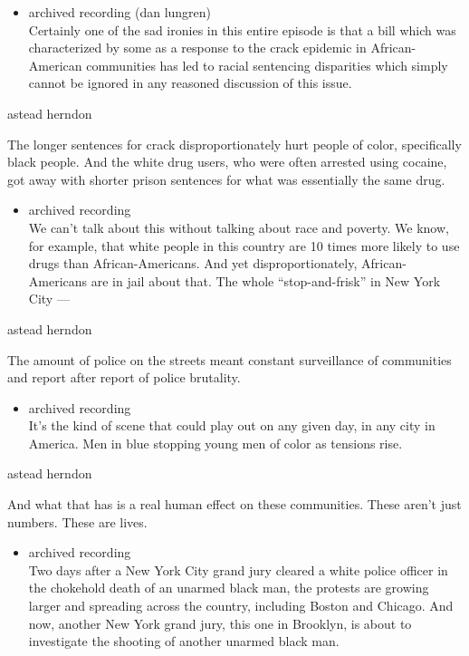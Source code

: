\begin{itemize}
\tightlist
\item
  archived recording (dan lungren)\\
  Certainly one of the sad ironies in this entire episode is that a bill
  which was characterized by some as a response to the crack epidemic in
  African-American communities has led to racial sentencing disparities
  which simply cannot be ignored in any reasoned discussion of this
  issue.
\end{itemize}

astead herndon

The longer sentences for crack disproportionately hurt people of color,
specifically black people. And the white drug users, who were often
arrested using cocaine, got away with shorter prison sentences for what
was essentially the same drug.

\begin{itemize}
\tightlist
\item
  archived recording\\
  We can't talk about this without talking about race and poverty. We
  know, for example, that white people in this country are 10 times more
  likely to use drugs than African-Americans. And yet
  disproportionately, African-Americans are in jail about that. The
  whole ``stop-and-frisk'' in New York City ---
\end{itemize}

astead herndon

The amount of police on the streets meant constant surveillance of
communities and report after report of police brutality.

\begin{itemize}
\tightlist
\item
  archived recording\\
  It's the kind of scene that could play out on any given day, in any
  city in America. Men in blue stopping young men of color as tensions
  rise.
\end{itemize}

astead herndon

And what that has is a real human effect on these communities. These
aren't just numbers. These are lives.

\begin{itemize}
\tightlist
\item
  archived recording\\
  Two days after a New York City grand jury cleared a white police
  officer in the chokehold death of an unarmed black man, the protests
  are growing larger and spreading across the country, including Boston
  and Chicago. And now, another New York grand jury, this one in
  Brooklyn, is about to investigate the shooting of another unarmed
  black man.
\end{itemize}

